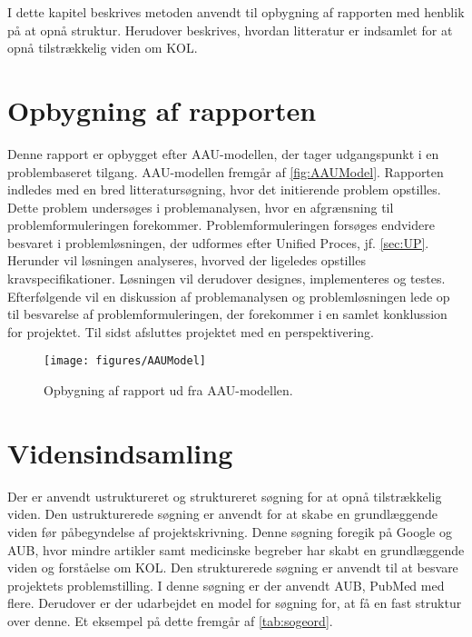 I dette kapitel beskrives metoden anvendt til opbygning af rapporten med henblik på at opnå struktur. Herudover beskrives, hvordan litteratur er indsamlet for at opnå tilstrækkelig viden om KOL.

\section{Opbygning af rapporten}
Denne rapport er opbygget efter AAU-modellen, der tager udgangspunkt i en problembaseret tilgang. AAU-modellen fremgår af \autoref{fig:AAUModel}. Rapporten indledes med en bred litteratursøgning, hvor det initierende problem opstilles. Dette problem undersøges i problemanalysen, hvor en afgrænsning til problemformuleringen forekommer. Problemformuleringen forsøges endvidere besvaret i problemløsningen, der udformes efter Unified Proces, jf. \autoref{sec:UP}. Herunder vil løsningen analyseres, hvorved der ligeledes opstilles kravspecifikationer. Løsningen vil derudover designes, implementeres og testes. Efterfølgende vil en diskussion af problemanalysen og problemløsningen lede op til besvarelse af problemformuleringen, der forekommer i en samlet konklussion for projektet. Til sidst afsluttes projektet med en perspektivering.


\begin{figure} [H]
\centering
\texttt{[image: figures/AAUModel]}
\caption{Opbygning af rapport ud fra AAU-modellen.}
\label{fig:AAUModel}
\end{figure} 

\section{Vidensindsamling}
Der er anvendt ustruktureret og struktureret søgning for at opnå tilstrækkelig viden. Den ustrukturerede søgning er anvendt for at skabe en grundlæggende viden før påbegyndelse af projektskrivning. Denne søgning foregik på Google og AUB, hvor mindre artikler samt medicinske begreber har skabt en grundlæggende viden og forståelse om KOL. Den strukturerede søgning er anvendt til at besvare projektets problemstilling. I denne søgning er der anvendt AUB, PubMed med flere. Derudover er der udarbejdet en model for søgning for, at få en fast struktur over denne. Et eksempel på dette fremgår af \autoref{tab:sogeord}.

